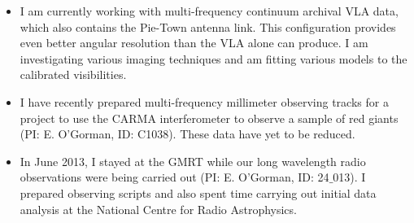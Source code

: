 \documentclass[11pt]{letter} %
\begin{document}
\begin{itemize}
    \item I am currently working with multi-frequency continuum archival VLA data, which also contains the Pie-Town antenna link. This configuration provides even better angular resolution than the VLA alone can produce. I am investigating various imaging techniques and am fitting various models to the calibrated visibilities.\\ 
    
    \item I have recently prepared multi-frequency millimeter observing tracks for a project to use the CARMA interferometer to observe a sample of red giants (PI: E. O'Gorman, ID: C1038). These data have yet to be reduced.\\ 
    
    \item In June 2013, I stayed at the GMRT while our long wavelength radio observations were being carried out (PI: E. O'Gorman, ID: 24$\_$013). I prepared observing scripts and also spent time carrying out initial data analysis at the National Centre for Radio Astrophysics.\\
      
   
   \end{itemize}
\end{document}
